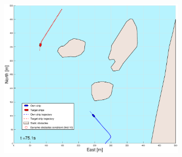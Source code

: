 \clearpage
\begin{figure}[!ht] %
    \begin{subfigure}[b]{0.49\textwidth}
        \centering
        \includegraphics[width=\textwidth]{Images/Figures/Helloya/_Simple_0fig1_time=75}

\end{subfigure}
\end{figure}
